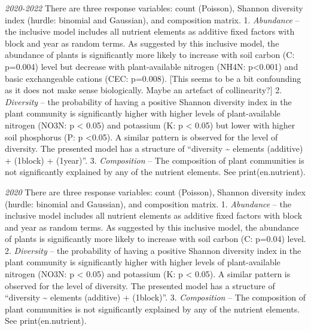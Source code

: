 \documentclass[
]{article}
\begin{document}
\emph{2020-2022} There are three response variables: count (Poisson),
Shannon diversity index (hurdle: binomial and Gaussian), and composition
matrix. 1. \emph{Abundance} -- the inclusive model includes all nutrient
elements as additive fixed factors with block and year as random terms.
As suggested by this inclusive model, the abundance of plants is
significantly more likely to increase with soil carbon (C: p=0.004)
level but decrease with plant-available nitrogen (NH4N: p\textless0.001)
and basic exchangeable cations (CEC: p=0.008). {[}This seems to be a bit
confounding as it does not make sense biologically. Maybe an artefact of
collinearity?{]} 2. \emph{Diversity} -- the probability of having a
positive Shannon diversity index in the plant community is significantly
higher with higher levels of plant-available nitrogen (NO3N: p
\textless{} 0.05) and potassium (K: p \textless{} 0.05) but lower with
higher soil phosphorus (P: p \textless0.05). A similar pattern is
observed for the level of diversity. The presented model has a structure
of ``diversity \textasciitilde{} elements (additive) + (1\textbar block)
+ (1\textbar year)''. 3. \emph{Composition} -- The composition of plant
communities is not significantly explained by any of the nutrient
elements. See print(en.nutrient).

\emph{2020} There are three response variables: count (Poisson), Shannon
diversity index (hurdle: binomial and Gaussian), and composition matrix.
1. \emph{Abundance} -- the inclusive model includes all nutrient
elements as additive fixed factors with block and year as random terms.
As suggested by this inclusive model, the abundance of plants is
significantly more likely to increase with soil carbon (C: p=0.04)
level. 2. \emph{Diversity} -- the probability of having a positive
Shannon diversity index in the plant community is significantly higher
with higher levels of plant-available nitrogen (NO3N: p \textless{}
0.05) and potassium (K: p \textless{} 0.05). A similar pattern is
observed for the level of diversity. The presented model has a structure
of ``diversity \textasciitilde{} elements (additive) +
(1\textbar block)''. 3. \emph{Composition} -- The composition of plant
communities is not significantly explained by any of the nutrient
elements. See print(en.nutrient).
\end{document}
